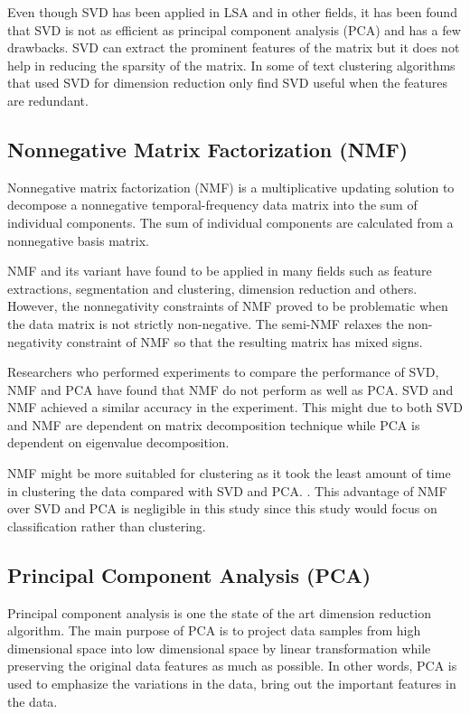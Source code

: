Even though SVD has been applied in LSA and in other fields, it has been found that SVD is not as efficient as principal component analysis (PCA) and has a few drawbacks. SVD can extract the prominent features of the matrix but it does not help in reducing the sparsity of the matrix. 	In some of text clustering algorithms that used SVD for dimension reduction only find SVD useful when the features are redundant. \cite{lingo}
		
\subsection{Nonnegative Matrix Factorization (NMF)}
Nonnegative matrix factorization (NMF) is a multiplicative updating solution to decompose a nonnegative temporal-frequency data matrix into the sum of individual components. The sum of individual components are calculated from a nonnegative basis matrix. \cite{nmfBook}
	
NMF and its variant have found to be applied in many fields such as feature extractions, segmentation and clustering, dimension reduction and others. However, the nonnegativity constraints of NMF proved to be problematic when the data matrix is not strictly non-negative. The semi-NMF relaxes the non-negativity constraint of NMF so that the resulting matrix has mixed signs. \cite{semiNmfPca}
	
Researchers who performed experiments to compare the performance of SVD, NMF and PCA have found that NMF do not perform as well as PCA. SVD and NMF achieved a similar accuracy in the experiment. This might due to both SVD and NMF are dependent on matrix decomposition technique while PCA is dependent on eigenvalue decomposition. \cite{dimReducArabic}
	
NMF might be more suitabled for clustering as it took the least amount of time in clustering the data compared with SVD and PCA. \cite{dimReducArabic}. This advantage of NMF over SVD and PCA is negligible in this study since this study would focus on classification rather than clustering.
	
\subsection{Principal Component Analysis (PCA)}
Principal component analysis is one the state of the art dimension reduction algorithm. The main purpose of PCA is to project data samples from high dimensional space into low dimensional space by linear transformation while preserving the original data features as much as possible. \cite{pcaImage} In other words, PCA is used to emphasize the variations in the data, bring out the important features in the data.
	
